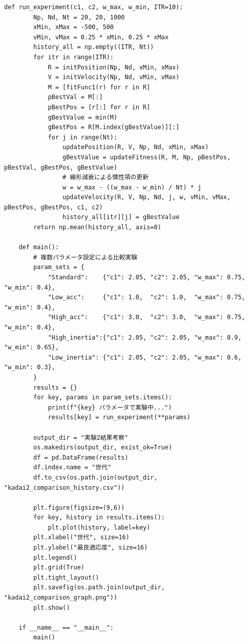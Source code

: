 \begin{lstlisting}[caption=PSOにおける各種パラメータ設定の比較実験コード, label=lst:kadai2_code]
    def run_experiment(c1, c2, w_max, w_min, ITR=10):
        Np, Nd, Nt = 20, 20, 1000
        xMin, xMax = -500, 500
        vMin, vMax = 0.25 * xMin, 0.25 * xMax
        history_all = np.empty((ITR, Nt))
        for itr in range(ITR):
            R = initPosition(Np, Nd, xMin, xMax)
            V = initVelocity(Np, Nd, vMin, vMax)
            M = [fitFunc1(r) for r in R]
            pBestVal = M[:]
            pBestPos = [r[:] for r in R]
            gBestValue = min(M)
            gBestPos = R[M.index(gBestValue)][:]
            for j in range(Nt):
                updatePosition(R, V, Np, Nd, xMin, xMax)
                gBestValue = updateFitness(R, M, Np, pBestPos, pBestVal, gBestPos, gBestValue)
                # 線形減衰による慣性項の更新
                w = w_max - ((w_max - w_min) / Nt) * j
                updateVelocity(R, V, Np, Nd, j, w, vMin, vMax, pBestPos, gBestPos, c1, c2)
                history_all[itr][j] = gBestValue
        return np.mean(history_all, axis=0)
    
    def main():
        # 複数パラメータ設定による比較実験
        param_sets = {
            "Standard":    {"c1": 2.05, "c2": 2.05, "w_max": 0.75, "w_min": 0.4},
            "Low_acc":     {"c1": 1.0,  "c2": 1.0,  "w_max": 0.75, "w_min": 0.4},
            "High_acc":    {"c1": 3.0,  "c2": 3.0,  "w_max": 0.75, "w_min": 0.4},
            "High_inertia":{"c1": 2.05, "c2": 2.05, "w_max": 0.9,  "w_min": 0.65},
            "Low_inertia": {"c1": 2.05, "c2": 2.05, "w_max": 0.6,  "w_min": 0.3},
        }
        results = {}
        for key, params in param_sets.items():
            print(f"{key} パラメータで実験中...")
            results[key] = run_experiment(**params)
        
        output_dir = "実験2結果考察"
        os.makedirs(output_dir, exist_ok=True)
        df = pd.DataFrame(results)
        df.index.name = "世代"
        df.to_csv(os.path.join(output_dir, "kadai2_comparison_history.csv"))
        
        plt.figure(figsize=(9,6))
        for key, history in results.items():
            plt.plot(history, label=key)
        plt.xlabel("世代", size=16)
        plt.ylabel("最良適応度", size=16)
        plt.legend()
        plt.grid(True)
        plt.tight_layout()
        plt.savefig(os.path.join(output_dir, "kadai2_comparison_graph.png"))
        plt.show()
    
    if __name__ == "__main__":
        main()
\end{lstlisting}



